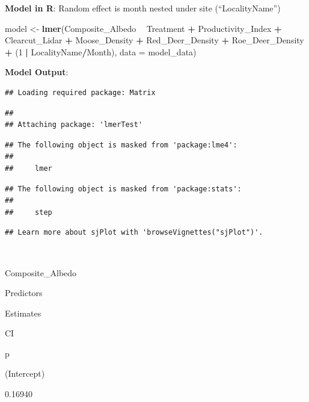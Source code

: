 \documentclass[]{article}
\newenvironment{Shaded}{\begin{snugshade}}{\end{snugshade}}
\newcommand{\KeywordTok}[1]{\textcolor[rgb]{0.13,0.29,0.53}{\textbf{#1}}}
\newcommand{\DataTypeTok}[1]{\textcolor[rgb]{0.13,0.29,0.53}{#1}}
\newcommand{\DecValTok}[1]{\textcolor[rgb]{0.00,0.00,0.81}{#1}}
\newcommand{\StringTok}[1]{\textcolor[rgb]{0.31,0.60,0.02}{#1}}
\newcommand{\OperatorTok}[1]{\textcolor[rgb]{0.81,0.36,0.00}{\textbf{#1}}}
\newcommand{\NormalTok}[1]{#1}
\begin{document}
\textbf{Model in R}: Random effect is month nested under site
(``LocalityName'')

\begin{Shaded}
\begin{Highlighting}[]
\NormalTok{model <-}\StringTok{ }\KeywordTok{lmer}\NormalTok{(Composite_Albedo }\OperatorTok{~}\StringTok{ }\NormalTok{Treatment }\OperatorTok{+}
\StringTok{                      }\NormalTok{Productivity_Index }\OperatorTok{+}
\StringTok{                      }\NormalTok{Clearcut_Lidar }\OperatorTok{+}
\StringTok{                      }\NormalTok{Moose_Density }\OperatorTok{+}
\StringTok{                      }\NormalTok{Red_Deer_Density }\OperatorTok{+}
\StringTok{                      }\NormalTok{Roe_Deer_Density }\OperatorTok{+}
\StringTok{                      }\NormalTok{(}\DecValTok{1} \OperatorTok{|}\StringTok{ }\NormalTok{LocalityName}\OperatorTok{/}\NormalTok{Month),}
              \DataTypeTok{data =}\NormalTok{ model_data)}
\end{Highlighting}
\end{Shaded}

\textbf{Model Output}:

\begin{verbatim}
## Loading required package: Matrix
\end{verbatim}

\begin{verbatim}
## 
## Attaching package: 'lmerTest'
\end{verbatim}

\begin{verbatim}
## The following object is masked from 'package:lme4':
## 
##     lmer
\end{verbatim}

\begin{verbatim}
## The following object is masked from 'package:stats':
## 
##     step
\end{verbatim}

\begin{verbatim}
## Learn more about sjPlot with 'browseVignettes("sjPlot")'.
\end{verbatim}

~

Composite\_Albedo

Predictors

Estimates

CI

p

(Intercept)

0.16940
\end{document}
